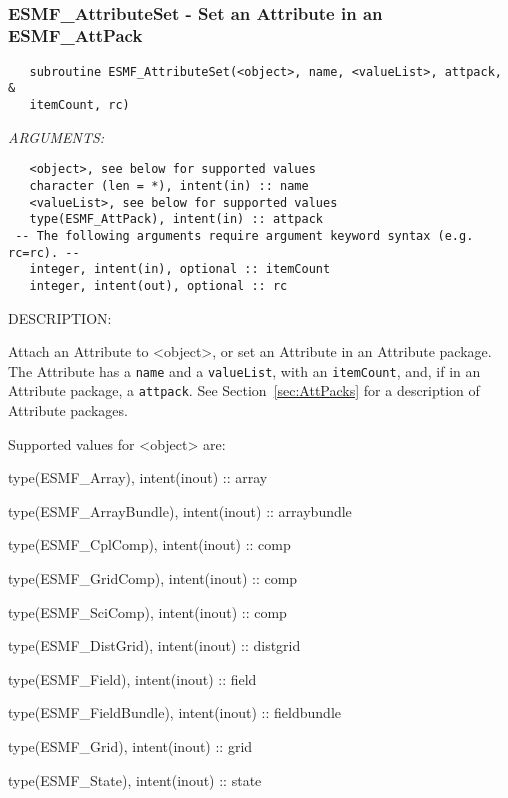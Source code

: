    
 
\mbox{}\hrulefill\ 
 
\subsubsection [ESMF\_AttributeSet] {ESMF\_AttributeSet - Set an Attribute in an ESMF\_AttPack}


  
\begin{verbatim}   subroutine ESMF_AttributeSet(<object>, name, <valueList>, attpack, &
   itemCount, rc)\end{verbatim}{\em ARGUMENTS:}
\begin{verbatim}   <object>, see below for supported values
   character (len = *), intent(in) :: name
   <valueList>, see below for supported values
   type(ESMF_AttPack), intent(in) :: attpack
 -- The following arguments require argument keyword syntax (e.g. rc=rc). --
   integer, intent(in), optional :: itemCount
   integer, intent(out), optional :: rc\end{verbatim}
{\sf DESCRIPTION:\\ }


   Attach an Attribute to <object>, or set an Attribute in an
   Attribute package. The Attribute has a {\tt name} and a
   {\tt valueList}, with an {\tt itemCount}, and, if in an Attribute
   package, a {\tt attpack}. See Section~\ref{sec:AttPacks} for a
   description of Attribute packages.
  
   Supported values for <object> are:
   \begin{description}
   \item type(ESMF\_Array), intent(inout) :: array
   \item type(ESMF\_ArrayBundle), intent(inout) :: arraybundle
   \item type(ESMF\_CplComp), intent(inout) :: comp
   \item type(ESMF\_GridComp), intent(inout) :: comp
   \item type(ESMF\_SciComp), intent(inout) :: comp
   \item type(ESMF\_DistGrid), intent(inout) :: distgrid
   \item type(ESMF\_Field), intent(inout) :: field
   \item type(ESMF\_FieldBundle), intent(inout) :: fieldbundle
   \item type(ESMF\_Grid), intent(inout) :: grid
   \item type(ESMF\_State), intent(inout) :: state
   \end{description}
  
